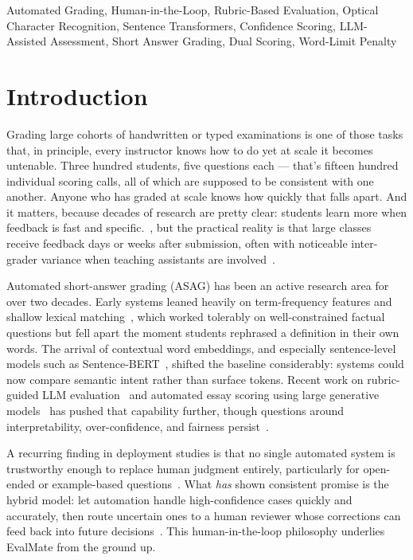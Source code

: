\documentclass[conference]{IEEEtran}
\begin{document}
\begin{IEEEkeywords}
Automated Grading, Human-in-the-Loop, Rubric-Based Evaluation,
Optical Character Recognition, Sentence Transformers, Confidence
Scoring, LLM-Assisted Assessment, Short Answer Grading,
Dual Scoring, Word-Limit Penalty
\end{IEEEkeywords}

\section{Introduction}

Grading large cohorts of handwritten or typed examinations is one
of those tasks that, in principle, every instructor knows how to
do yet at scale it becomes untenable. Three hundred students, five questions each — that's fifteen hundred individual scoring calls, all of which are supposed to be consistent with one another. Anyone who has graded at scale knows how quickly that falls apart. And it matters, because decades of research are pretty clear: students learn more when feedback is fast and specific.~\cite{shute2008}, but the
practical reality is that large classes receive feedback days or
weeks after submission, often with noticeable inter-grader variance
when teaching assistants are involved~\cite{devalla2025}.

Automated short-answer grading (ASAG) has been an active research
area for over two decades. Early systems leaned heavily on
term-frequency features and shallow lexical matching~\cite{murff2025},
which worked tolerably on well-constrained factual questions but
fell apart the moment students rephrased a definition in their own
words. The arrival of contextual word embeddings, and especially
sentence-level models such as Sentence-BERT~\cite{reimers2019},
shifted the baseline considerably: systems could now compare
semantic intent rather than surface tokens. Recent work on
rubric-guided LLM evaluation~\cite{anghel2025} and automated essay
scoring using large generative models~\cite{sibarani2025} has
pushed that capability further, though questions around
interpretability, over-confidence, and fairness persist~\cite{guo2017}.

A recurring finding in deployment studies is that no single
automated system is trustworthy enough to replace human judgment
entirely, particularly for open-ended or example-based
questions~\cite{fathali2025}. What \textit{has} shown consistent
promise is the hybrid model: let automation handle high-confidence
cases quickly and accurately, then route uncertain ones to a human
reviewer whose corrections can feed back into future
decisions~\cite{yang2025}. This human-in-the-loop philosophy
underlies EvalMate from the ground up.
\end{document}
